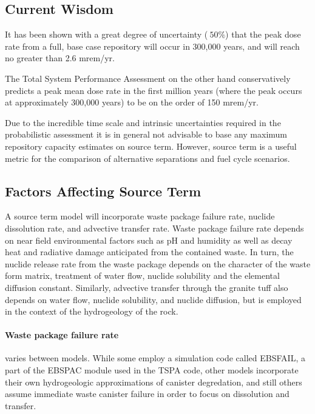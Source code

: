 \subsection{Current Wisdom}
It has been shown with a great degree of uncertainty ($~50\%$) that the peak dose rate from a full, 
base case repository will occur in 300,000 years, and will reach no greater than 2.6 
mrem/yr.\cite{li_methodology_2006}

The Total System Performance Assessment on the other hand conservatively predicts a peak mean dose 
rate in the first million years (where the peak occurs at approximately 300,000 years) to be on the 
order of 150 mrem/yr.\cite{williams_contract_2001} 

Due to the incredible time scale and intrinsic uncertainties required in the probabilistic 
assessment it is in general not advisable to base any maximum repository capacity estimates on 
source term. However, source term is a useful metric for the comparison of alternative separations 
and fuel cycle scenarios.

\subsection{Factors Affecting Source Term}
A source term model will incorporate waste package failure rate, nuclide dissolution rate, and 
advective transfer rate. Waste package failure rate depends on near field environmental factors such 
as pH and humidity as well as decay heat and radiative damage anticipated from the contained waste.  
In turn, the nuclide release rate from the waste package depends on the character of the waste form 
matrix, treatment of water flow, nuclide solubility and the elemental diffusion constant. Similarly, 
advective transfer through the granite tuff also depends on water flow, nuclide solubility, and 
nuclide diffusion, but is employed in the context of the hydrogeology of the rock.   

\paragraph{Waste package failure rate} varies between models. While some employ a simulation code 
called EBSFAIL, a part of the EBSPAC module used in the TSPA code, other models incorporate their 
own hydrogeologic approximations of canister degredation, and still others assume immediate waste 
canister failure in order to focus on dissolution and transfer.  \newline

